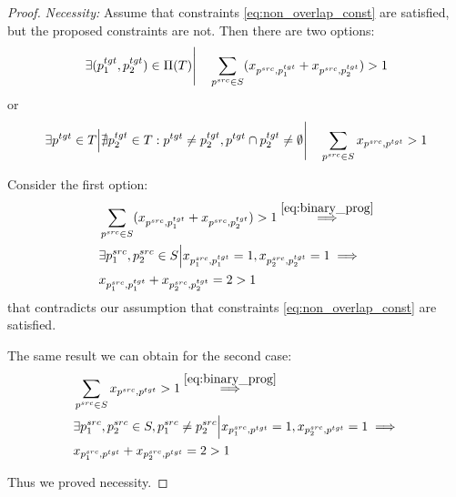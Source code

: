 \begin{proof}
  \textit{Necessity:} Assume that constraints \eqref{eq:non_overlap_const} are satisfied, but
  the proposed constraints are not. Then there are two options:
  \[
    \exists (p_1^{tgt}, p_2^{tgt}) \in \Pi(T) \Bigg| \quad
    \sum\limits_{p^{src} \in S} (x_{p^{src}, p_1^{tgt}} + x_{p^{src}, p_2^{tgt}}) > 1
  \]
  or
  \[
    \exists p^{tgt} \in T \Big|
    \nexists p_2^{tgt} \in T: p^{tgt} \neq p_2^{tgt}, p^{tgt} \cap p_2^{tgt} \neq \emptyset
    \Bigg| \quad \sum\limits_{p^{src} \in S} x_{p^{src}, p^{tgt}} > 1
  \]

  Consider the first option:
  \begin{align*}
    & \sum\limits_{p^{src} \in S} (x_{p^{src}, p_1^{tgt}} + x_{p^{src}, p_2^{tgt}}) > 1
    \stackrel{\eqref{eq:binary_prog}}{\implies}                                                                     \\
    & \exists p_1^{src}, p_2^{src} \in S \Big| x_{p_1^{src}, p_1^{tgt}} = 1, x_{p_2^{src}, p_2^{tgt}} = 1 \implies \\
    & x_{p_1^{src}, p_1^{tgt}} + x_{p_2^{src}, p_2^{tgt}} = 2 > 1
  \end{align*}
  that contradicts our assumption that constraints \eqref{eq:non_overlap_const} are satisfied.

  The same result we can obtain for the second case:
  \begin{align*}
    & \sum\limits_{p^{src} \in S} x_{p^{src}, p^{tgt}} > 1
    \stackrel{\eqref{eq:binary_prog}}{\implies}                                                                                           \\
    & \exists p_1^{src}, p_2^{src} \in S, p_1^{src} \neq p_2^{src} \Big| x_{p_1^{src}, p^{tgt}} = 1, x_{p_2^{src}, p^{tgt}} = 1 \implies \\
    & x_{p_1^{src}, p^{tgt}} + x_{p_2^{src}, p^{tgt}} = 2 > 1
  \end{align*}

  Thus we proved necessity.


\end{proof}
